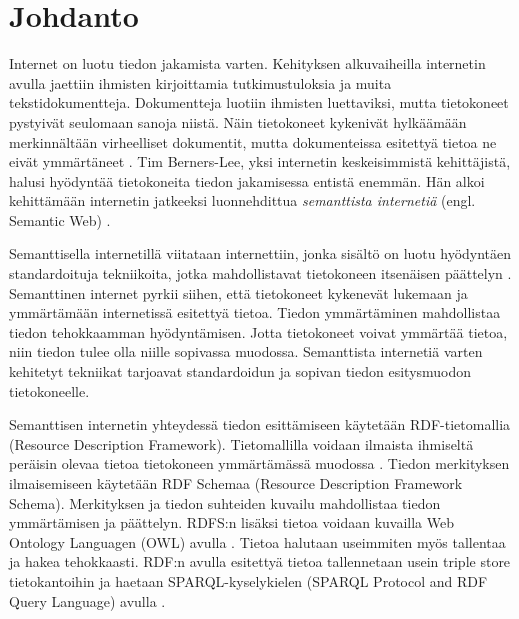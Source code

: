 \documentclass[finnish, 12pt, a4paper, elec, utf8, pdfa, online]{aaltothesis}
\begin{document}
\cleardoublepage


\section{Johdanto}

\thispagestyle{empty}
Internet on luotu tiedon jakamista varten. Kehityksen alkuvaiheilla internetin avulla jaettiin ihmisten kirjoittamia tutkimustuloksia ja muita tekstidokumentteja. Dokumentteja luotiin ihmisten luettaviksi, mutta tietokoneet pystyivät seulomaan sanoja niistä. Näin tietokoneet kykenivät hylkäämään merkinnältään virheelliset dokumentit, mutta dokumenteissa esitettyä tietoa ne eivät ymmärtäneet \cite{WWW}. Tim Berners-Lee, yksi internetin keskeisimmistä kehittäjistä, halusi hyödyntää tietokoneita tiedon jakamisessa entistä enemmän. Hän alkoi kehittämään internetin jatkeeksi luonnehdittua \textit{semanttista internetiä} (engl. Semantic Web) \cite{Berners_visio}.

Semanttisella internetillä viitataan internettiin, jonka sisältö on luotu hyödyntäen standardoituja tekniikoita, jotka mahdollistavat tietokoneen itsenäisen päättelyn \cite{Berners_visio}. Semanttinen internet pyrkii siihen, että tietokoneet kykenevät lukemaan ja ymmärtämään internetissä esitettyä tietoa. Tiedon ymmärtäminen mahdollistaa tiedon tehokkaamman hyödyntämisen. Jotta tietokoneet voivat ymmärtää tietoa, niin tiedon tulee olla niille sopivassa muodossa. Semanttista internetiä varten kehitetyt tekniikat tarjoavat standardoidun ja sopivan tiedon esitysmuodon tietokoneelle.

Semanttisen internetin yhteydessä tiedon esittämiseen käytetään RDF-tietomallia (Resource Description Framework). Tietomallilla voidaan ilmaista ihmiseltä peräisin olevaa tietoa tietokoneen ymmärtämässä muodossa \cite{RDF_specification}. Tiedon merkityksen ilmaisemiseen käytetään RDF Schemaa (Resource Description Framework Schema). Merkityksen ja tiedon suhteiden kuvailu mahdollistaa tiedon ymmärtämisen ja päättelyn. RDFS:n lisäksi tietoa voidaan kuvailla Web Ontology Languagen (OWL) avulla \cite{OWL_specification}. Tietoa halutaan useimmiten myös tallentaa ja hakea tehokkaasti. RDF:n avulla esitettyä tietoa tallennetaan usein triple store tietokantoihin ja haetaan SPARQL-kyselykielen (SPARQL Protocol and RDF Query Language) avulla \cite{sparql}.
\end{document}
